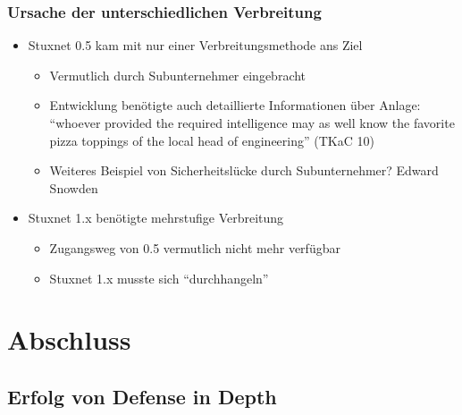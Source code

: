 \documentclass{beamer}
\begin{document}
\begin{frame}
  \frametitle{Ursache der unterschiedlichen Verbreitung}
  \begin{itemize}
    \item<1-> Stuxnet 0.5 kam mit nur einer Verbreitungsmethode ans Ziel
      \begin{itemize}
        \item Vermutlich durch Subunternehmer eingebracht
        \item Entwicklung benötigte auch detaillierte Informationen über Anlage:
          ``whoever provided the required intelligence may as well know the favorite pizza toppings of the local head of engineering'' (TKaC 10)
      \end{itemize}
      \begin{itemize} %
        \item Weiteres Beispiel von Sicherheitslücke durch Subunternehmer? \pause Edward Snowden
      \end{itemize}
    \item<3-> Stuxnet 1.x benötigte mehrstufige Verbreitung
      \begin{itemize}
        \item Zugangsweg von 0.5 vermutlich nicht mehr verfügbar
        \item Stuxnet 1.x musste sich ``durchhangeln''
      \end{itemize}
  \end{itemize}
\end{frame}

\section{Abschluss}

\subsection{Erfolg von Defense in Depth}
\end{document}
